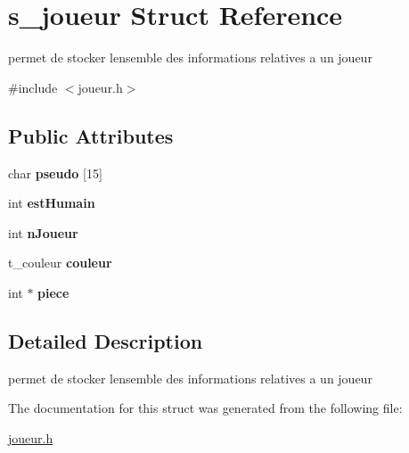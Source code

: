 \hypertarget{structs__joueur}{}\section{s\+\_\+joueur Struct Reference}
\label{structs__joueur}


permet de stocker l\textquotesingle{}ensemble des informations relatives a un joueur  




{\ttfamily \#include $<$joueur.\+h$>$}

\subsection*{Public Attributes}
\begin{DoxyCompactItemize}
\item 
char {\bfseries pseudo} \mbox{[}15\mbox{]}\hypertarget{structs__joueur_a48ccb56720a4acbd3e43240469514bbe}{}\label{structs__joueur_a48ccb56720a4acbd3e43240469514bbe}

\item 
int {\bfseries est\+Humain}\hypertarget{structs__joueur_aa58c2ef96933809a9851604379ce7760}{}\label{structs__joueur_aa58c2ef96933809a9851604379ce7760}

\item 
int {\bfseries n\+Joueur}\hypertarget{structs__joueur_a700b69362c0084e8c2e7f41a459b5d44}{}\label{structs__joueur_a700b69362c0084e8c2e7f41a459b5d44}

\item 
t\+\_\+couleur {\bfseries couleur}\hypertarget{structs__joueur_a82bbd904732dc6a4be40a1a29dac4983}{}\label{structs__joueur_a82bbd904732dc6a4be40a1a29dac4983}

\item 
int $\ast$ {\bfseries piece}\hypertarget{structs__joueur_a3cd83582f34f83b03ca207b931d59cc1}{}\label{structs__joueur_a3cd83582f34f83b03ca207b931d59cc1}

\end{DoxyCompactItemize}


\subsection{Detailed Description}
permet de stocker l\textquotesingle{}ensemble des informations relatives a un joueur 

The documentation for this struct was generated from the following file\+:\begin{DoxyCompactItemize}
\item 
\hyperlink{joueur_8h}{joueur.\+h}\end{DoxyCompactItemize}
